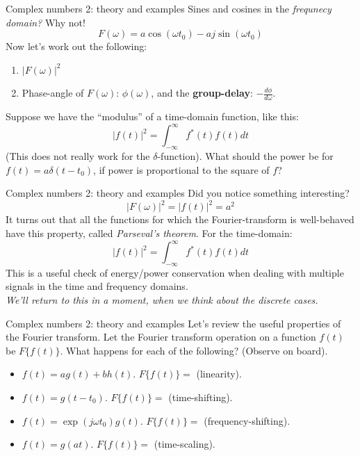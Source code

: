 \documentclass{beamer}
\begin{document}
\begin{frame}[fragile]{Complex numbers 2: theory and examples}
\small
Sines and cosines in the \textit{frequnecy domain?}  Why not!
\begin{equation}
F(\omega) = a \cos(\omega t_0) - a j\sin(\omega t_0)
\end{equation}
Now let's work out the following:
\begin{enumerate}
\item $|F(\omega)|^2$
\item Phase-angle of $F(\omega)$: $\phi(\omega)$, and the \textbf{\alert{group-delay}}: $-\frac{d\phi}{d\omega}$.
\end{enumerate}
Suppose we have the ``modulus'' of a time-domain function, like this:
\begin{equation}
|f(t)|^2 = \int_{-\infty}^{\infty} f^*(t) f(t) dt
\end{equation}
(This does not really work for the $\delta$-function).  What should the power be for $f(t) = a\delta(t-t_0)$, if power is proportional to the square of $f$?
\end{frame}

\begin{frame}[fragile]{Complex numbers 2: theory and examples}
\small
Did you notice something interesting?
\begin{equation}
|F(\omega)|^2 = |f(t)|^2 = a^2
\end{equation}
It turns out that all the functions for which the Fourier-transform is well-behaved have this property, called \textit{Parseval's theorem}. For the time-domain:
\begin{equation}
|f(t)|^2 = \int_{-\infty}^{\infty} f^*(t) f(t) dt
\end{equation}
This is a useful check of energy/power conservation when dealing with multiple signals in the time and frequency domains. \\ \vspace{0.5cm}
\textit{We'll return to this in a moment, when we think about the discrete cases.}
\end{frame}

\begin{frame}[fragile]{Complex numbers 2: theory and examples}
\small
Let's review the useful properties of the Fourier transform.  Let the Fourier transform operation on a function $f(t)$ be $F\lbrace f(t) \rbrace$.  What happens for each of the following? (Observe on board).
\begin{itemize}
\item $f(t) = a g(t) + b h(t)$.  $F\lbrace f(t) \rbrace = $ (linearity).
\item $f(t) = g(t-t_0)$.  $F\lbrace f(t) \rbrace = $ (time-shifting).
\item $f(t) = \exp(j\omega t_0)g(t)$.  $F\lbrace f(t) \rbrace = $ (frequency-shifting).
\item $f(t) = g(at)$.  $F\lbrace f(t) \rbrace = $ (time-scaling).
\end{itemize}
\end{frame}
\end{document}
